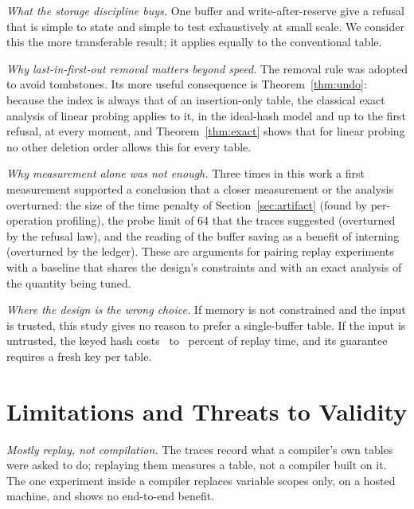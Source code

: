 \emph{What the storage discipline buys.} One buffer and write-after-reserve give a refusal that is simple to state and simple to test exhaustively at small scale. We consider this the more transferable result; it applies equally to the conventional table.

\emph{Why last-in-first-out removal matters beyond speed.} The removal rule was adopted to avoid tombstones. Its more useful consequence is Theorem~\ref{thm:undo}: because the index is always that of an insertion-only table, the classical exact analysis of linear probing applies to it, in the ideal-hash model and up to the first refusal, at every moment, and Theorem~\ref{thm:exact} shows that for linear probing no other deletion order allows this for every table.

\emph{Why measurement alone was not enough.} Three times in this work a first measurement supported a conclusion that a closer measurement or the analysis overturned: the size of the time penalty of Section~\ref{sec:artifact} (found by per-operation profiling), the probe limit of 64 that the traces suggested (overturned by the refusal law), and the reading of the buffer saving as a benefit of interning (overturned by the ledger). These are arguments for pairing replay experiments with a baseline that shares the design's constraints and with an exact analysis of the quantity being tuned.

\emph{Where the design is the wrong choice.} If memory is not constrained and the input is trusted, this study gives no reason to prefer a single-buffer table. If the input is untrusted, the keyed hash costs \KeyedLo\ to \KeyedHi\ percent of replay time, and its guarantee requires a fresh key per table.

\section{Limitations and Threats to Validity}
\label{sec:limits}

\emph{Mostly replay, not compilation.} The traces record what a compiler's own tables were asked to do; replaying them measures a table, not a compiler built on it. The one experiment inside a compiler replaces variable scopes only, on a hosted machine, and shows no end-to-end benefit.

